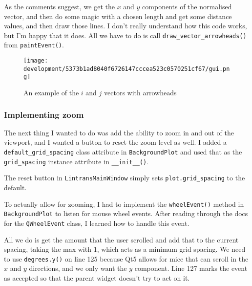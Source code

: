 \documentclass[../development.tex]{subfiles}
\begin{document}

As the comments suggest, we get the $x$ and $y$ components of the normalised vector, and then do some magic with a chosen length and get some distance values, and then draw those lines. I don't really understand how this code works, but I'm happy that it does. All we have to do is call \texttt{draw\_vector\_arrowheads()} from \texttt{paintEvent()}.

\begin{figure}[H]
	\centering
	\texttt{[image: development/5373b1ad8040f6726147cccea523c0570251cf67/gui.png]}
	\caption{An example of the $i$ and $j$ vectors with arrowheads}
	\label{fig:development:5373b1ad8040f6726147cccea523c0570251cf67:gui.png}
\end{figure}

\subsubsection{Implementing zoom\label{development:improving-the-gui:implementing-zoom}}

The next thing I wanted to do was add the ability to zoom in and out of the viewport, and I wanted a button to reset the zoom level as well. I added a \texttt{default\_grid\_spacing} class attribute in \texttt{BackgroundPlot} and used that as the \texttt{grid\_spacing} instance attribute in \texttt{\_\_init\_\_()}.


The reset button in \texttt{LintransMainWindow} simply sets \texttt{plot.grid\_spacing} to the default.

To actually allow for zooming, I had to implement the \texttt{wheelEvent()} method in \texttt{BackgroundPlot} to listen for mouse wheel events. After reading through the docs for the \texttt{QWheelEvent} class\cite{qt5-docs-qwheelevent}, I learned how to handle this event.


All we do is get the amount that the user scrolled and add that to the current spacing, taking the max with 1, which acts as a minimum grid spacing. We need to use \texttt{degrees.y()} on line 125 because Qt5 allows for mice that can scroll in the $x$ and $y$ directions, and we only want the $y$ component. Line 127 marks the event as accepted so that the parent widget doesn't try to act on it.
\end{document}
